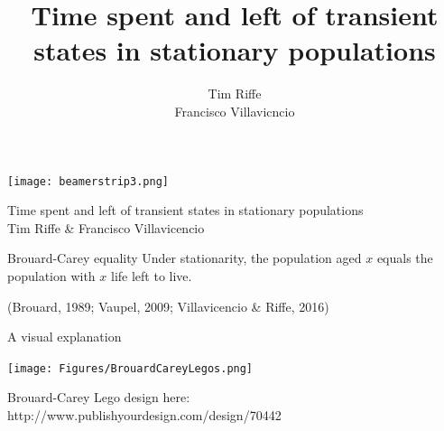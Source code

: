 \documentclass[20pt]{beamer}
\title{Time spent and left of transient states in
stationary populations}
\subtitle{Tim Riffe \\ Francisco Villavicncio}		%
\begin{document}

\begin{frame}[plain]
	\vspace{-4.4cm}
 \centerline{\texttt{[image: beamerstrip3.png]}}

	
	\huge
	\vspace{1em}
	
	Time spent and left of transient states in stationary populations\\
	\vspace{1em}
	\large 
	Tim Riffe \& Francisco Villavicencio
\end{frame}


\begin{frame}[plain]
\Large
 \begin{block}{Brouard-Carey equality}
  Under stationarity, the population aged $x$ equals the population with $x$ life left to live.\\ 
 \end{block}
\small{(Brouard, 1989; Vaupel, 2009; Villavicencio \& Riffe, 2016)}
\end{frame}

\begin{frame}[plain]
\Large
\centering
A visual explanation

\end{frame}

\begin{frame}[plain]
\texttt{[image: Figures/BrouardCareyLegos.png]}

Brouard-Carey Lego design here:\\
http://www.publishyourdesign.com/design/70442
\end{frame}
\end{document}
